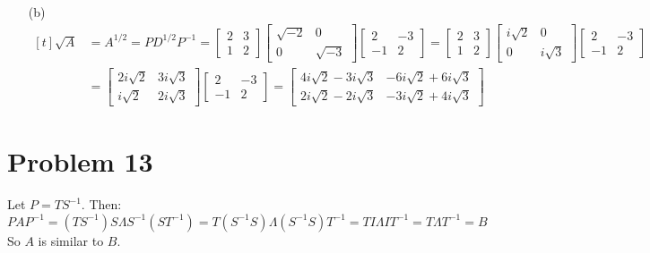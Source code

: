 \documentclass{article}
\newcommand*{\problem}[1]{\section*{Problem #1}}
\begin{document}
\begin{itemize}
\item[(b)]
	$\begin{aligned}[t]
	    \sqrt{A}
		&=A^{1/2}
		=PD^{1/2}P^{-1}
		=\begin{bmatrix}
			2 & 3 \\
			1 & 2
		\end{bmatrix}
		\begin{bmatrix}
			\sqrt{-2} & 0 \\
			0 & \sqrt{-3}
		\end{bmatrix}
		\begin{bmatrix}
			2 & -3 \\
			-1 & 2
		\end{bmatrix}
		=\begin{bmatrix}
			2 & 3 \\
			1 & 2
		\end{bmatrix}
		\begin{bmatrix}
			i \sqrt{2} & 0 \\
			0 & i \sqrt{3}
		\end{bmatrix}
		\begin{bmatrix}
			2 & -3 \\
			-1 & 2
		\end{bmatrix} \\
		&=\begin{bmatrix}
			2i \sqrt{2} & 3i \sqrt{3} \\
			i \sqrt{2} & 2i \sqrt{3}
		\end{bmatrix}
		\begin{bmatrix}
			2 & -3 \\
			-1 & 2
		\end{bmatrix}
		=\begin{bmatrix}
			4i \sqrt{2}-3i \sqrt{3} & -6i \sqrt{2}+6i \sqrt{3} \\
			2i \sqrt{2}-2i \sqrt{3} & -3i \sqrt{2}+4i \sqrt{3}
		\end{bmatrix}
	\end{aligned}$

\end{itemize}

\problem{13}
Let $P=TS^{-1}$. Then:
\begin{equation*}
	PAP^{-1}
	=\left(TS^{-1}\right)S\Lambda S^{-1} \left(ST^{-1}\right)
	=T \left(S^{-1}S\right)\Lambda \left(S^{-1}S\right)T^{-1}
	=TI\Lambda IT^{-1}
	=T\Lambda T^{-1}
	=B
\end{equation*}
So $A$ is similar to $B$.
\end{document}
